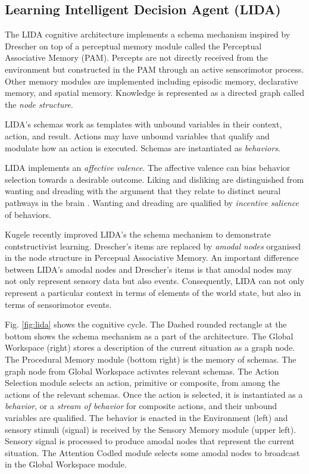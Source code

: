 \documentclass[runningheads]{llncs}
\begin{document}
\subsection{Learning Intelligent Decision Agent (LIDA)}
\label{sec:lida}

The LIDA cognitive architecture \cite{kugele_learning_2021}  implements a schema mechanism inspired by Drescher on top of a perceptual memory module called the Perceptual Associative Memory (PAM). 
Percepts are not directly received from the environment but constructed in the PAM through an active sensorimotor process. 
Other memory modules are implemented including episodic memory, declarative memory, and spatial memory.
Knowledge is represented as a directed graph called the \textit{node structure}. 

LIDA's schemas work as templates with unbound variables in their context, action, and result. 
Actions may have  unbound variables that qualify and modulate how an action is executed. 
Schemas are instantiated as \textit{behaviors}. 

LIDA implements an \textit{affective valence}. 
The affective valence can bias behavior selection towards a desirable outcome. 
Liking and disliking are distinguished from wanting and dreading with the argument that they relate to distinct neural pathways in the brain \cite{kringelbach_functional_2010}. 
Wanting and dreading are qualified by \textit{incentive salience} of behaviors.   

Kugele \cite{kugele2025_constructivist} recently improved LIDA's the schema mechanism to demonstrate contstructivist learning.
Drescher's items are replaced by \textit{amodal nodes} organised in the node structure in Percepual Associative Memory. 
An important difference between LIDA's amodal nodes and Drescher's items is that amodal nodes may not only represent sensory data but also events. 
Consequently, LIDA can not only represent a particular context in terms of elements of the world state, but also in terms of sensorimotor events. 

Fig. \ref{fig:lida} shows the cognitive cycle. 
The Dashed rounded rectangle at the bottom shows the schema mechanism as a part of the architecture. 
The Global Workspace (right) stores a description of the current situation as a graph node. 
The Procedural Memory module (bottom right) is the memory of schemas. 
The graph node from Global Workspace activates relevant schemas. 
The Action Selection module selects an action, primitive or composite, from among the actions of the relevant schemas. 
Once the action is selected, it is instantiated as a \textit{behavior}, or a \textit{stream of behavior} for composite actions, and their unbound variables are qualified. 
The behavior is enacted in the Environment (left) and sensory stimuli (signal) is received by the Sensory Memory module (upper left).
Sensory signal is processed to produce amodal nodes that represent the current situation. 
The Attention Codled module selects some amodal nodes to broadcast in the Global Workspace module. 
\end{document}
